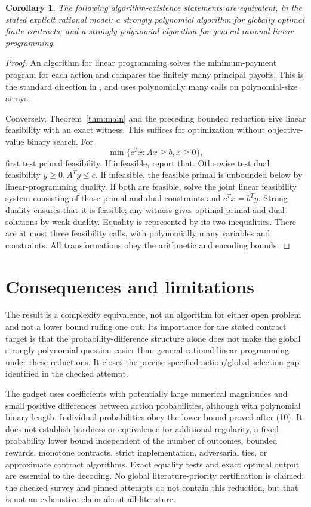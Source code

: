 \documentclass[11pt]{article}
\newtheorem{corollary}[theorem]{Corollary}
\begin{document}
\begin{corollary}\label{cor:equivalence}
The following algorithm-existence statements are equivalent, in the stated
explicit rational model: a strongly polynomial algorithm for globally
optimal finite contracts, and a strongly polynomial algorithm for general
rational linear programming.
\end{corollary}
\begin{proof}
An algorithm for linear programming solves the minimum-payment program for
each action and compares the finitely many principal payoffs. This is the
standard direction in \cite[Proposition 3.1]{survey}, and uses polynomially
many calls on polynomial-size arrays.

Conversely, Theorem~\ref{thm:main} and the preceding bounded reduction give
linear feasibility with an exact witness. This suffices for optimization
without objective-value binary search. For
\[
 \min\{c^Tx:Ax\geq b,x\geq0\},
\]
first test primal feasibility. If infeasible, report that. Otherwise test
dual feasibility \(y\geq0,A^Ty\leq c\). If infeasible, the feasible
primal is unbounded below by linear-programming duality. If both are
feasible, solve the joint linear feasibility system consisting of those
primal and dual constraints and \(c^Tx=b^Ty\). Strong duality ensures
that it is feasible; any witness gives optimal primal and dual solutions
by weak duality. Equality is represented by its two inequalities. There
are at most three feasibility calls, with polynomially many variables and
constraints. All transformations obey the arithmetic and encoding bounds.
\end{proof}

\section{Consequences and limitations}
The result is a complexity equivalence, not an algorithm for either open
problem and not a lower bound ruling one out. Its importance for the stated
contract target is that the probability-difference structure alone does not
make the global strongly polynomial question easier than general rational
linear programming under these reductions. It closes the precise
specified-action/global-selection gap identified in the checked attempt.

The gadget uses coefficients with potentially large numerical magnitudes
and small positive differences between action probabilities, although with
polynomial binary length. Individual probabilities obey the lower bound
proved after (10). It does not establish hardness or equivalence for
additional regularity, a fixed probability lower bound independent of the
number of outcomes, bounded rewards, monotone contracts,
strict implementation, adversarial ties, or approximate contract algorithms.
Exact equality tests and exact optimal output are essential to the decoding.
No global literature-priority certification is claimed: the checked survey
and pinned attempts do not contain this reduction, but that is not an
exhaustive claim about all literature.
\end{document}
